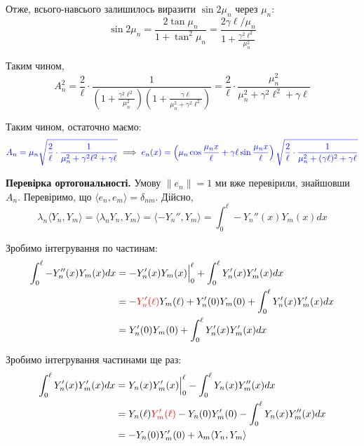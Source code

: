 \documentclass{hw_template}
\begin{document}
Отже, всього-навсього залишилось виразити $\sin 2\mu_n$ через $\mu_n$:
\begin{equation*}
    \sin 2\mu_n = \frac{2 \tan \mu_n}{1+\tan^2\mu_n} = \frac{2\gamma \ell/\mu_n}{1+\frac{\gamma^2\ell^2}{\mu_n^2}}
\end{equation*}

Таким чином,
\begin{equation*}
    A_n^2 = \frac{2}{\ell} \cdot \frac{1}{\left(1+\frac{\gamma^2\ell^2}{\mu_n^2}\right)\left(1+\frac{\gamma \ell}{\mu_n^2+\gamma^2\ell^2}\right)} = \frac{2}{\ell} \cdot \frac{\mu_n^2}{\mu_n^2 + \gamma^2\ell^2 + \gamma \ell}
\end{equation*}

Таким чином, остаточно маємо:
\begin{equation*}
    \textcolor{blue}{A_n = \mu_n \sqrt{\frac{2}{\ell} \cdot \frac{1}{\mu_n^2 + \gamma^2\ell^2 + \gamma \ell}}} \implies \textcolor{blue}{e_n(x) = \left(\mu_n \cos \frac{\mu_n x}{\ell} + \gamma \ell\sin\frac{\mu_n x}{\ell}\right)\sqrt{\frac{2}{\ell} \cdot \frac{1}{\mu_n^2 + (\gamma \ell)^2 + \gamma \ell}}}
\end{equation*}

\textbf{Перевірка ортогональності.} Умову $\|e_n\|=1$ ми вже перевірили,
знайшовши $A_n$. Перевіримо, що $\langle e_n, e_m \rangle = \delta_{nm}$. 
Дійсно,
\begin{equation*}
    \lambda_n\langle Y_n, Y_m \rangle = \langle \lambda_nY_n, Y_m \rangle = \langle -Y_n'', Y_m \rangle = \int_0^{\ell} -Y_n''(x)Y_m(x)dx
\end{equation*}

Зробимо інтегрування по частинам:
\begin{align*}
    \int_0^{\ell} -Y_n''(x)Y_m(x)dx &= -Y_n'(x)Y_m(x)\Big|_0^{\ell} + \int_0^{\ell} Y_n'(x)Y_m'(x)dx \\
    &= -\textcolor{red}{Y_n'(\ell)}Y_m(\ell) + Y_n'(0)Y_m(0) + \int_0^{\ell} Y_n'(x)Y_m'(x)dx \\
    & = Y_n'(0)Y_m(0) + \int_0^{\ell} Y_n'(x)Y_m'(x)dx
\end{align*}

Зробимо інтегрування частинами ще раз:
\begin{align*}
    \int_0^{\ell} Y_n'(x)Y_m'(x)dx &= Y_n(x)Y_m'(x)\Big|_0^{\ell} - \int_0^{\ell} Y_n(x)Y_m''(x)dx \\
    &= Y_n(\ell)\textcolor{red}{Y_m'(\ell)} - Y_n(0)Y_m'(0) - \int_0^{\ell} Y_n(x)Y_m''(x)dx \\
    &= - Y_n(0)Y_m'(0) + \lambda_m\langle Y_n, Y_m \rangle
\end{align*}
\end{document}
